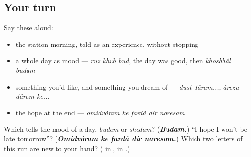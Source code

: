 \subsection*{Your turn}
Say these aloud:

\begin{itemize}
\raggedright
  \item the station morning, told as an experience, without stopping
  \item a whole day as mood — \emph{ruz khub bud}, the day was good, then \emph{khoshhâl budam}
  \item something you'd like, and something you dream of — \emph{dust dâram...}, \emph{ârezu dâram ke...}
  \item the hope at the end — \emph{omidvâram ke fardâ dir naresam}
\end{itemize}

\begin{tcolorbox}[breakable,colback=teal!4,colframe=teal!35!black,title={Before you move on}]
Which tells the mood of a day, \emph{budam} or \emph{shodam}? (\emph{\textbf{Budam.}}) \textquotedblleft{}I hope I won't be late tomorrow\textquotedblright{}? (\emph{\textbf{Omidvâram ke fardâ dir naresam.}}) Which two letters of this run are new to your hand? (\textbf{} in \textbf{}, \textbf{} in \textbf{}.)
\end{tcolorbox}
